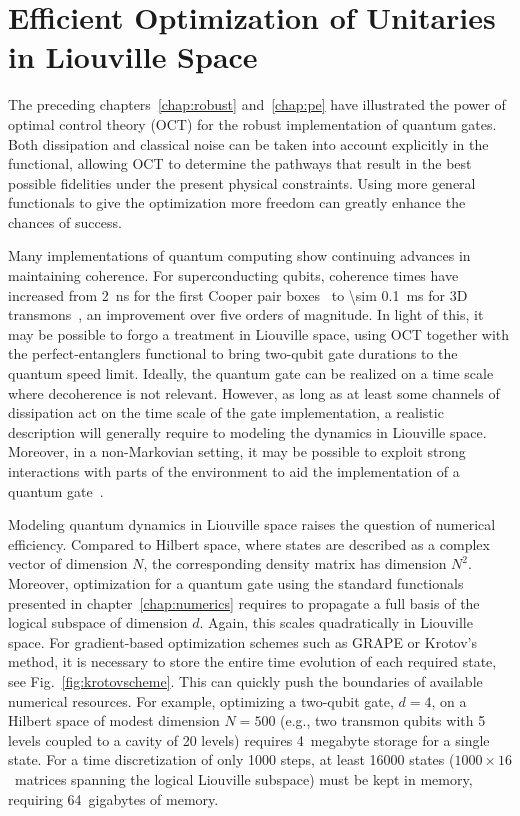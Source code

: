 \chapter{Efficient Optimization of Unitaries in Liouville Space}
\label{chap:3states}


The preceding chapters~\ref{chap:robust} and~\ref{chap:pe} have illustrated
the power of optimal control theory (OCT) for the robust implementation of quantum
gates. Both dissipation and classical noise can be taken into account explicitly
in the functional, allowing OCT to determine the pathways that result in the
best possible fidelities under the present physical constraints. Using more
general functionals to give the optimization more freedom can greatly enhance
the chances of success.

Many implementations of quantum computing show continuing advances in
maintaining coherence. For superconducting qubits, coherence times have
increased from \SI{2}{ns} for the first Cooper pair boxes~\cite{NakamuraN1999}
to \SI{\sim 0.1}{ms} for 3D transmons~\cite{RigettiPRB2012}, an improvement over
five orders of magnitude.  In light of this, it may be possible to forgo
a treatment in Liouville space, using OCT together with the perfect-entanglers
functional to bring two-qubit gate durations to the quantum speed limit.
Ideally, the quantum gate can be realized on a time scale where decoherence is
not relevant. However, as long as at least some channels of dissipation act on
the time scale of the gate implementation, a realistic description
will generally require to modeling the dynamics in Liouville space.  Moreover,
in a non-Markovian setting, it may be possible to exploit strong interactions
with parts of the environment to aid the implementation of a quantum
gate~\cite{ReichNonMarkov}.

Modeling quantum dynamics in Liouville space raises the question of numerical
efficiency. Compared to Hilbert space, where states are described as a complex
vector of dimension $N$, the corresponding density matrix has dimension $N^2$.
Moreover, optimization for a quantum gate using the standard functionals
presented in chapter~\ref{chap:numerics} requires to propagate a full basis of
the logical subspace of dimension $d$. Again, this scales quadratically in
Liouville space. For gradient-based optimization schemes such as GRAPE or Krotov's
method, it is necessary to store the entire time evolution of each required
state, see Fig.~\ref{fig:krotovscheme}. This can quickly push the boundaries of
available numerical resources. For example, optimizing a two-qubit gate, $d=4$,
on a Hilbert space of modest dimension $N=500$ (e.g., two transmon qubits with
5 levels coupled to a cavity of 20 levels) requires \SI{4}{megabyte} storage for
a single state. For a time discretization of only 1000 steps, at least 16000
states ($1000 \times 16$~matrices spanning the logical Liouville subspace) must
be kept in memory, requiring 64~gigabytes of memory.

